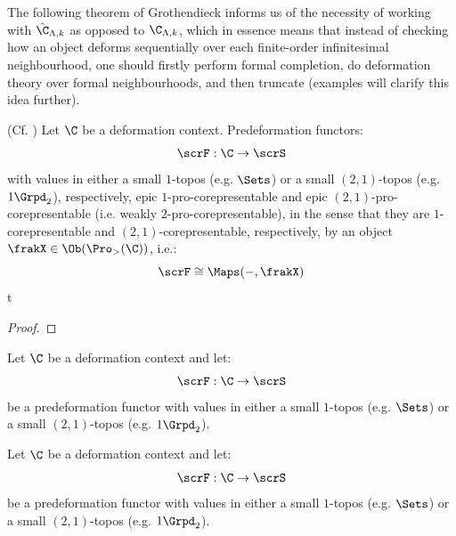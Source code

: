         The following theorem of Grothendieck informs us of the necessity of working with $\hat{\C}_{\Lambda, k}$ as opposed to $\C_{\Lambda, k}$, which in essence means that instead of checking how an object deforms sequentially over each finite-order infinitesimal neighbourhood, one should firstly perform formal completion, do deformation theory over formal neighbourhoods, and then truncate (examples will clarify this idea further). 
        \begin{theorem}  \label{theorem: predeformation_functors_are_pro_corepresentable}
            (Cf. \cite[Proposition 3.1]{grothendieck_fga_2}) Let $\C$ be a deformation context. Predeformation functors:
                $$\scrF: \C \to \scrS$$
            with values in either a small $1$-topos (e.g. $\Sets$) or a small $(2, 1)$-topos (e.g. $1\-\Grpd_2$), respectively, epic $1$-pro-corepresentable and epic $(2, 1)$-pro-corepresentable (i.e. weakly $2$-pro-corepresentable), in the sense that they are $1$-corepresentable and $(2, 1)$-corepresentable, respectively, by an object $\frakX \in \Ob(\Pro_{>}(\C))$, i.e.:
                $$\scrF \cong \Maps(-, \frakX)$$t
        \end{theorem}
            \begin{proof}
                
            \end{proof}
        \begin{corollary}
            Let $\C$ be a deformation context and let:
                $$\scrF: \C \to \scrS$$
            be a predeformation functor with values in either a small $1$-topos (e.g. $\Sets$) or a small $(2, 1)$-topos (e.g. $1\-\Grpd_2$). 
        \end{corollary}
        \begin{convention}
            Let $\C$ be a deformation context and let:
                $$\scrF: \C \to \scrS$$
            be a predeformation functor with values in either a small $1$-topos (e.g. $\Sets$) or a small $(2, 1)$-topos (e.g. $1\-\Grpd_2$). 
        \end{convention}

